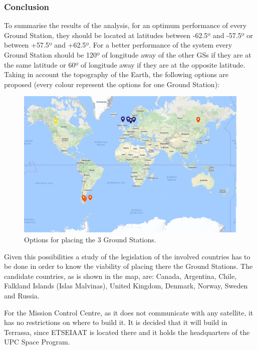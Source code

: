 \subsubsection{Conclusion}
To summarise the results of the analysis, for an optimum performance of every Ground Station, they should be located at latitudes between -62.5º and -57.5º or between +57.5º and +62.5º. For a better performance of the system every Ground Station should be 120º of longitude away of the other GSs if they are at the same latitude or 60º of longitude away if they are at the opposite latitude. Taking in account the topography of the Earth, the following options are proposed (every colour represent the options for one Ground Station):
\begin{figure}[H]
\begin{center}
\includegraphics[scale=0.5]{Options.jpg}
\caption{Options for placing the 3 Ground Stations.}
\end{center}
\end{figure}

Given this possibilities a study of the legislation of the involved countries has to be done in order to know the viability of placing there the Ground Stations. The candidate countries, as is shown in the map, are: Canada, Argentina, Chile, Falkland Islands (Islas Malvinas), United Kingdom, Denmark, Norway, Sweden and Russia. 

For the Mission Control Centre, as it does not communicate with any satellite, it has no restrictions on where to build it. It is decided that it will build in Terrassa, since ETSEIAAT is located there and it holds the headquarters of the UPC Space Program.